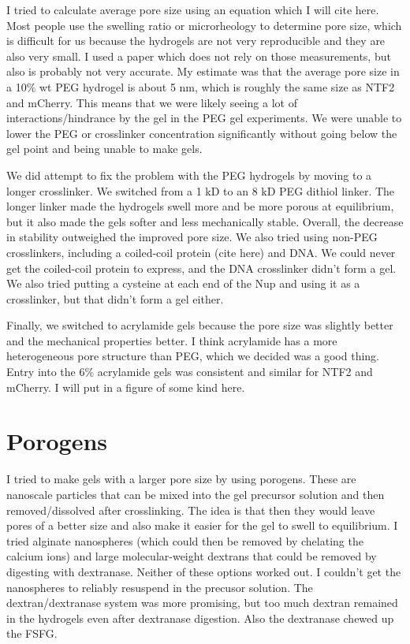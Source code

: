 I tried to calculate average pore size using an equation which I will cite here.  Most people use the swelling ratio or microrheology to determine pore size, which is difficult for us because the hydrogels are not very reproducible and they are also very small.  I used a paper which does not rely on those measurements, but also is probably not very accurate.  My estimate was that the average pore size in a 10\% wt PEG hydrogel is about 5 nm, which is roughly the same size as NTF2 and mCherry.  This means that we were likely seeing a lot of interactions/hindrance by the gel in the PEG gel experiments.  We were unable to lower the PEG or crosslinker concentration significantly without going below the gel point and being unable to make gels.

We did attempt to fix the problem with the PEG hydrogels by moving to a longer crosslinker.  We switched from a 1 kD to an 8 kD PEG dithiol linker.  The longer linker made the hydrogels swell more and be more porous at equilibrium, but it also made the gels softer and less mechanically stable.  Overall, the decrease in stability outweighed the improved pore size.  We also tried using non-PEG crosslinkers, including a coiled-coil protein (cite here) and DNA.  We could never get the coiled-coil protein to express, and the DNA crosslinker didn't form a gel.  We also tried putting a cysteine at each end of the Nup and using it as a crosslinker, but that didn't form a gel either.

Finally, we switched to acrylamide gels because the pore size was slightly better and the mechanical properties better.  I think acrylamide has a more heterogeneous pore structure than PEG, which we decided was a good thing.  Entry into the 6\% acrylamide gels was consistent and similar for NTF2 and mCherry.  I will put in a figure of some kind here.

\section{Porogens}

I tried to make gels with a larger pore size by using porogens.  These are nanoscale particles that can be mixed into the gel precursor solution and then removed/dissolved after crosslinking.  The idea is that then they would leave pores of a better size and also make it easier for the gel to swell to equilibrium.  I tried alginate nanospheres (which could then be removed by chelating the calcium ions) and large molecular-weight dextrans that could be removed by digesting with dextranase.  Neither of these options worked out.  I couldn't get the nanospheres to reliably resuspend in the precusor solution.  The dextran/dextranase system was more promising, but too much dextran remained in the hydrogels even after dextranase digestion.  Also the dextranase chewed up the FSFG.

